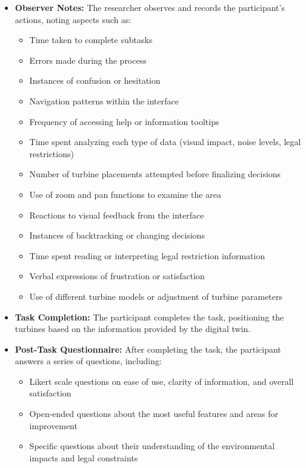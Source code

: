 \documentclass[11pt, titlepage, a4paper]{scrartcl}
\begin{document}
\begin{linenumbers}
\begin{itemize}
        \item \textbf{Observer Notes:} The researcher observes and records the participant's actions, noting aspects such as:
              \begin{itemize}
                  \item Time taken to complete subtasks
                  \item Errors made during the process
                  \item Instances of confusion or hesitation
                  \item Navigation patterns within the interface
                  \item Frequency of accessing help or information tooltips
                  \item Time spent analyzing each type of data (visual impact, noise levels, legal restrictions)
                  \item Number of turbine placements attempted before finalizing decisions
                  \item Use of zoom and pan functions to examine the area
                  \item Reactions to visual feedback from the interface
                  \item Instances of backtracking or changing decisions
                  \item Time spent reading or interpreting legal restriction information
                  \item Verbal expressions of frustration or satisfaction
                  \item Use of different turbine models or adjustment of turbine parameters
              \end{itemize}

        \item \textbf{Task Completion:} The participant completes the task, positioning the turbines based on the information provided by the digital twin.

        \item \textbf{Post-Task Questionnaire:} After completing the task, the participant answers a series of questions, including:
              \begin{itemize}
                  \item Likert scale questions on ease of use, clarity of information, and overall satisfaction
                  \item Open-ended questions about the most useful features and areas for improvement
                  \item Specific questions about their understanding of the environmental impacts and legal constraints
              \end{itemize}


\end{itemize}
\end{linenumbers}
\end{document}
